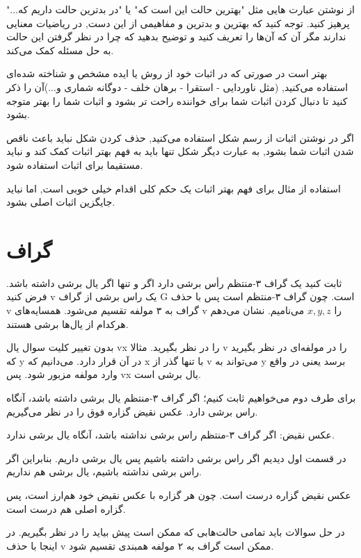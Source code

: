 \documentclass[11pt,largemargins]{h2wp}
\begin{document}
از نوشتن عبارت هایی مثل "بهترین حالت این است که" یا "در بدترین حالت داریم که..." پرهیز کنید. توجه کنید که بهترین و بدترین و مفاهیمی از این دست, در ریاضیات معنایی ندارند مگر آن که آن‌ها را تعریف کنید و توضیح بدهید که چرا در نظر گرفتن این حالت به حل مسئله کمک می‌کند.

بهتر است در صورتی که در اثبات خود از روش یا ایده مشخص و شناخته شده‌ای استفاده می‌کنید, (مثل ناوردایی - استقرا - برهان خلف - دوگانه شماری و...)آن را ذکر کنید تا دنبال کردن اثبات شما برای خواننده راحت تر بشود و اثبات شما را بهتر متوجه بشود.

اگر در نوشتن اثبات از رسم شکل استفاده می‌کنید, حذف کردن شکل نباید باعث ناقص شدن اثبات شما بشود, به عبارت دیگر شکل تنها باید به فهم بهتر اثبات کمک کند و نباید مستقیما برای اثبات استفاده شود.

استفاده از مثال برای فهم بهتر اثبات یک حکم کلی اقدام خیلی خوبی است, اما نباید جایگزین اثبات اصلی بشود.

\chapter*{گراف}

\question
    ثابت کنید یک گراف ۳-منتظم رأس برشی دارد اگر و تنها اگر یال برشی داشته‌ باشد. 
 \solution 
 فرض کنید v یک راس برشی از گراف G است. چون گراف ۳-منتظم است پس با حذف v گراف به ۳ مولفه تقسیم می‌شود. همسایه‌های v را $ x, y, z  $ می‌نامیم. نشان می‌دهم هرکدام از یال‌ها برشی هستند.
 
 بدون تغییر کلیت سوال یال vx را در نظر بگیرید. مثالا v را در مولفه‌ای در نظر بگیرید که y در آن قرار دارد. می‌دانیم که x با تنها گذر از v می‌تواند به y برسد یعنی در واقع وارد مولفه مزبور شود. پس vx یال برشی است.
 
 برای طرف دوم می‌خواهیم ثابت کنیم؛ اگر گراف ۳-منتظم یال برشی داشته باشد، آنگاه راس برشی دارد.
 عکس نقیض گزاره فوق را در نظر می‌گیریم.
 
 عکس نقیض: اگر گراف ۳-منتظم راس برشی نداشته باشد، آنگاه یال برشی ندارد.
 
 در قسمت اول دیدیم اگر راس برشی داشته باشیم پس یال برشی داریم. بنابراین اگر راس برشی نداشته باشیم، یال برشی هم نداریم.
 
 عکس نقیض گزاره درست است. چون هر گزاره با عکس نقیض خود هم‌ارز است، پس گزاره اصلی هم درست است.
 
 \notes
 
 در حل سوالات باید تمامی حالت‌هابی که ممکن است پیش بیاید را در نظر بگیریم. در اینجا با حذف v ممکن است گراف به ۲ مولفه همبندی تقسیم شود.
 
\end{document}

